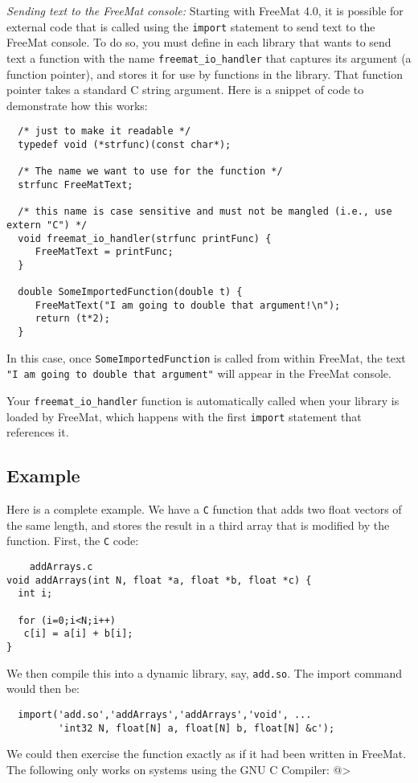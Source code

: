 \emph{Sending text to the FreeMat console:}
Starting with FreeMat 4.0, it is possible for external code that is 
called using the \verb|import| statement to send text to the FreeMat console.
To do so, you must define in each library that wants to send text a 
function with the name \verb|freemat_io_handler| that captures its 
argument (a function pointer), and stores it
for use by functions in the library.  That function pointer takes a 
standard C string argument.  Here is a snippet of code to demonstrate
how this works:
\begin{verbatim}
  /* just to make it readable */
  typedef void (*strfunc)(const char*); 

  /* The name we want to use for the function */
  strfunc FreeMatText;                  

  /* this name is case sensitive and must not be mangled (i.e., use extern "C") */
  void freemat_io_handler(strfunc printFunc) {
     FreeMatText = printFunc;
  }

  double SomeImportedFunction(double t) {
     FreeMatText("I am going to double that argument!\n");
     return (t*2);
  }
\end{verbatim}
In this case, once \verb|SomeImportedFunction| is called from within FreeMat, the
text \verb|"I am going to double that argument"| will appear in the FreeMat console.

Your \verb|freemat_io_handler| function is automatically called when your library is
loaded by FreeMat, which happens with the first \verb|import| statement that references
it.

\subsection{Example}

Here is a complete example.  We have a \verb|C| function that adds
two float vectors of the same length, and stores the result in a third array 
that is modified by the function.  First, the \verb|C| code:
\begin{verbatim}
    addArrays.c
void addArrays(int N, float *a, float *b, float *c) {
  int i;
 
  for (i=0;i<N;i++)
   c[i] = a[i] + b[i];
}
\end{verbatim}
We then compile this into a dynamic library, say, \verb|add.so|.  The import 
command would then be:
\begin{verbatim}
  import('add.so','addArrays','addArrays','void', ...
         'int32 N, float[N] a, float[N] b, float[N] &c');
\end{verbatim}
We could then exercise the function exactly as if it had been written
in FreeMat.  The following only works on systems using the GNU
C Compiler:
@>
